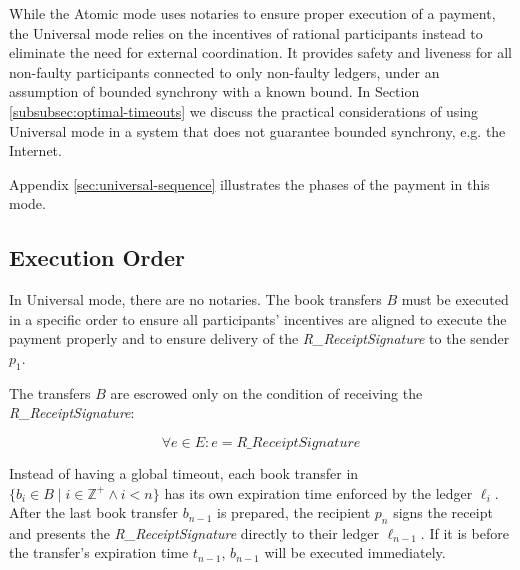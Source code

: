\documentclass[letterpaper,twocolumn,10pt]{article}
\begin{document}

While the Atomic mode uses notaries to ensure proper execution of a payment, the Universal mode relies on the incentives of rational participants instead to eliminate the need for external coordination. It provides safety and liveness for all non-faulty participants connected to only non-faulty ledgers, under an assumption of bounded synchrony with a known bound. In Section \ref{subsubsec:optimal-timeouts} we discuss the practical considerations of using Universal mode in a system that does not guarantee bounded synchrony, e.g. the Internet.

Appendix \ref{sec:universal-sequence} illustrates the phases of the payment in this mode.


\subsection{Execution Order}


In Universal mode, there are no notaries. The book transfers $B$ must be executed in a specific order to ensure all participants' incentives are aligned to execute the payment properly and to ensure delivery of the \textit{R\_ReceiptSignature} to the sender $p_1$.

The transfers $B$ are escrowed only on the condition of receiving the \textit{R\_ReceiptSignature}:

\begin{equation}
\forall e \in E : e = \textit{R\_ReceiptSignature}
\end{equation}

Instead of having a global timeout, each book transfer in $ \{ b_i \in B \mid i \in \mathbb{Z}^+ \land i < n \} $ has its own expiration time enforced by the ledger $\ell_i$. 
After the last book transfer $b_{n-1}$ is prepared, the recipient $p_n$ signs the receipt and presents the \textit{R\_ReceiptSignature} directly to their ledger $\ell_{n-1}$. If it is before the transfer's expiration time $t_{n-1}$, $b_{n-1}$ will be executed immediately.
\end{document}
